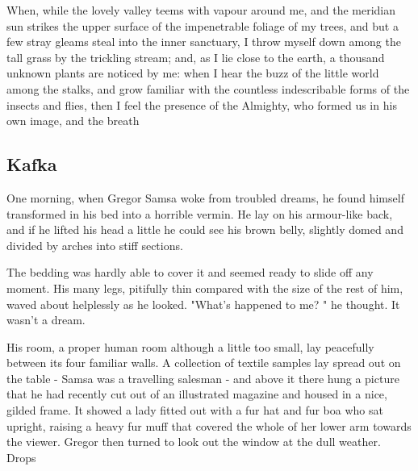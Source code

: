     When, while the lovely valley teems with vapour around me, and the meridian sun strikes the upper surface of the impenetrable foliage of my trees, and but a few stray gleams steal into the inner sanctuary, I throw myself down among the tall grass by the trickling stream; and, as I lie close to the earth, a thousand unknown plants are noticed by me: when I hear the buzz of the little world among the stalks, and grow familiar with the countless indescribable forms of the insects and flies, then I feel the presence of the Almighty, who formed us in his own image, and the breath

\subsection{Kafka}

    One morning, when Gregor Samsa woke from troubled dreams, he found himself transformed in his bed into a horrible vermin. He lay on his armour-like back, and if he lifted his head a little he could see his brown belly, slightly domed and divided by arches into stiff sections.

    The bedding was hardly able to cover it and seemed ready to slide off any moment. His many legs, pitifully thin compared with the size of the rest of him, waved about helplessly as he looked. "What's happened to me? " he thought. It wasn't a dream.

    His room, a proper human room although a little too small, lay peacefully between its four familiar walls. A collection of textile samples lay spread out on the table - Samsa was a travelling salesman - and above it there hung a picture that he had recently cut out of an illustrated magazine and housed in a nice, gilded frame. It showed a lady fitted out with a fur hat and fur boa who sat upright, raising a heavy fur muff that covered the whole of her lower arm towards the viewer. Gregor then turned to look out the window at the dull weather. Drops


